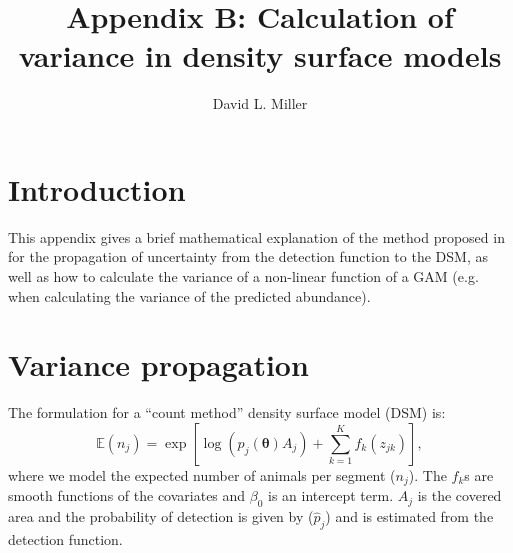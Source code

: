 \documentclass[11pt]{amsart}
\title{Appendix B: Calculation of variance in density surface models}
\author{David L. Miller}
\begin{document}
\maketitle


\section{Introduction}

This appendix gives a brief mathematical explanation of the method proposed in \cite{WILLIAMS:2011in} for the propagation of uncertainty from the detection function to the DSM, as well as how to calculate the variance of a non-linear function of a GAM (e.g. when calculating the variance of the predicted abundance).

\section{Variance propagation}

The formulation for a ``count method'' density surface model (DSM) is:
\begin{equation*}
\mathbb{E}(n_j) = \exp\left[ \log\left(p_j(\bm{\theta})A_j\right) + \sum_{k=1}^K f_k(z_{jk}) \right],
\end{equation*}
where we model the expected number of animals per segment ($n_j$). The $f_k$s are smooth functions of the covariates and $\beta_0$ is an intercept term. $A_j$ is the covered area and the probability of detection is given by ($\hat{p}_j$) and is estimated from the detection function.
\end{document}
